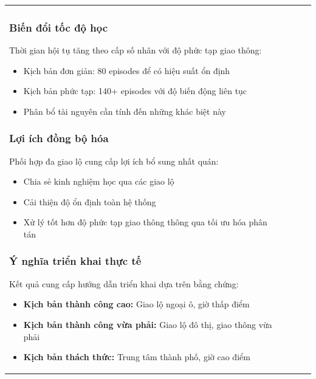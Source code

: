 \begin{table}[!htp]
\begin{tabular}{@{}lccc@{}}
\subsubsection{Biến đổi tốc độ học}
Thời gian hội tụ tăng theo cấp số nhân với độ phức tạp giao thông:
\begin{itemize}
    \item Kịch bản đơn giản: 80 episodes để có hiệu suất ổn định
    \item Kịch bản phức tạp: 140+ episodes với độ biến động liên tục
    \item Phân bổ tài nguyên cần tính đến những khác biệt này
\end{itemize}

\subsubsection{Lợi ích đồng bộ hóa}
Phối hợp đa giao lộ cung cấp lợi ích bổ sung nhất quán:
\begin{itemize}
    \item Chia sẻ kinh nghiệm học qua các giao lộ
    \item Cải thiện độ ổn định toàn hệ thống
    \item Xử lý tốt hơn độ phức tạp giao thông thông qua tối ưu hóa phân tán
\end{itemize}

\subsubsection{Ý nghĩa triển khai thực tế}
Kết quả cung cấp hướng dẫn triển khai dựa trên bằng chứng:
\begin{itemize}
    \item \textbf{Kịch bản thành công cao:} Giao lộ ngoại ô, giờ thấp điểm
    \item \textbf{Kịch bản thành công vừa phải:} Giao lộ đô thị, giao thông vừa phải
    \item \textbf{Kịch bản thách thức:} Trung tâm thành phố, giờ cao điểm
\end{itemize}




\end{tabular}
\end{table}

